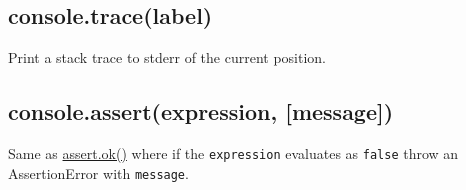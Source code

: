 \subsection{console.trace(label)}

Print a stack trace to stderr of the current position.

\subsection{console.assert(expression, {[}message{]})}

Same as
\href{assert.html\#assert\_assert\_value\_message\_assert\_ok\_value\_message}{assert.ok()}
where if the \texttt{expression} evaluates as \texttt{false} throw an
AssertionError with \texttt{message}.

